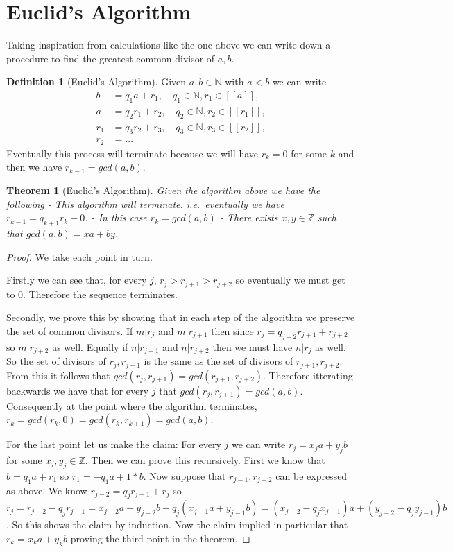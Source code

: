 \documentclass[
]{book}
\newtheorem{theorem}{Theorem}[chapter]
\theoremstyle{definition}
\newtheorem{definition}{Definition}[chapter]
\theoremstyle{definition}
\theoremstyle{definition}
\theoremstyle{definition}
\theoremstyle{remark}
\begin{document}
\section{Euclid's Algorithm}\label{euclids-algorithm}

Taking inspiration from calculations like the one above we can write down a procedure to find the greatest common divisor of \(a,b\).

\begin{definition}[Euclid's Algorithm]
Given \(a, b \in \mathbb{N}\) with \(a < b\) we can write
\begin{align*}
b &= q_1a + r_1, \quad q_1 \in \mathbb{N}, r_1 \in [[a]],\\
a &= q_2r_1 + r_2, \quad q_2 \in \mathbb{N}, r_2 \in [[r_1]],\\
r_1 &= q_3r_2 + r_3, \quad q_3 \in \mathbb{N}, r_3 \in [[r_2]],\\
r_2 & = \dots
\end{align*}
Eventually this process will terminate because we will have \(r_k = 0\) for some \(k\) and then we have \(r_{k-1} = gcd(a,b)\).
\end{definition}

\begin{theorem}[Euclid's Algorithm]
Given the algorithm above we have the following
- This algorithm will terminate. i.e.~eventually we have \(r_{k-1} = q_{k+1} r_{k} + 0\).
- In this case \(r_{k} = gcd(a,b)\)
- There exists \(x,y \in \mathbb{Z}\) such that \(gcd(a,b) = xa+by\).
\end{theorem}

\begin{proof}
We take each point in turn.

Firstly we can see that, for every \(j\), \(r_j> r_{j+1} > r_{j+2}\) so eventually we must get to 0. Therefore the sequence terminates.

Secondly, we prove this by showing that in each step of the algorithm we preserve the set of common divisors. If \(m|r_j\) and \(m|r_{j+1}\) then since \(r_j = q_{j+2}r_{j+1} + r_{j+2}\) so \(m|r_{j+2}\) as well. Equally if \(n|r_{j+1}\) and \(n|r_{j+2}\) then we must have \(n|r_j\) as well. So the set of divisors of \(r_j, r_{j+1}\) is the same as the set of divisors of \(r_{j+1},r_{j+2}\). From this it follows that \(gcd(r_j,r_{j+1})=gcd(r_{j+1},r_{j+2})\). Therefore itterating backwards we have that for every \(j\) that \(gcd(r_j, r_{j+1}) = gcd(a,b)\). Consequently at the point where the algorithm terminates, \(r_k = gcd(r_k,0)=gcd(r_k,r_{k+1})=gcd(a,b)\).

For the last point let us make the claim: For every \(j\) we can write \(r_j = x_j a + y_j b\) for some \(x_j, y_j \in \mathbb{Z}\). Then we can prove this recursively. First we know that \(b=q_1 a + r_1\) so \(r_1 = -q_1 a + 1*b\). Now suppose that \(r_{j-1}, r_{j-2}\) can be expressed as above. We know \(r_{j-2} = q_j r_{j-1} + r_j\) so \(r_j = r_{j-2} - q_j r_{j-1} = x_{j-2} a + y_{j-2} b - q_j(x_{j-1}a + y_{j-1}b) = (x_{j-2}-q_j x_{j-1})a + (y_{j-2} - q_j y_{j-1})b\). So this shows the claim by induction. Now the claim implied in particular that \(r_k = x_k a + y_k b\) proving the third point in the theorem.
\end{proof}
\end{document}
